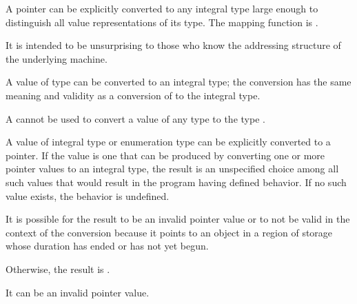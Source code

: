 \pnum
{}%
%
A pointer can be explicitly converted to any integral type large enough
to distinguish all value representations of its type.
%
The mapping function is .
\begin{note}
It is intended to be unsurprising to those who know the addressing
structure of the underlying machine.
\end{note}
A value of type  can be converted to an integral
type; the conversion has the same meaning and validity as a conversion of
 to the integral type.
\begin{note}
A 
cannot be used to convert a value of any type to the type
.
\end{note}

\pnum
{}%
%
A value of integral type or enumeration type can be explicitly converted
to a pointer.
If the value is one that can be produced
by converting one or more pointer values
to an integral type,
the result is an unspecified choice among all such values
that would result in the program having defined behavior.
If no such value exists,
the behavior is undefined.
%
%
%
%
%
\begin{note}
It is possible for the result
to be an invalid pointer value or
to not be valid in the context of the conversion
because it points to an object in a region of storage
whose duration has ended or has not yet begun.
\end{note}
%
Otherwise, the result is
.
\begin{note}
It can be an invalid pointer value.
\end{note}

